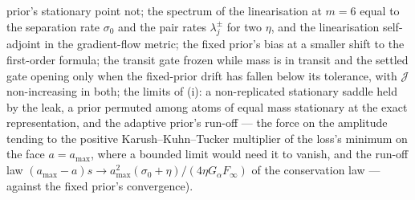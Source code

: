 {prior's stationary point not; the spectrum of the linearisation at $m = 6$ equal to the separation rate $\sigma_0$
and the pair rates $\lambda_j^\pm$ for two $\eta$, and the linearisation self-adjoint in the gradient-flow metric;
the fixed prior's bias at a smaller shift to the first-order formula; the transit gate frozen while mass is in
transit and the settled gate opening only when the fixed-prior drift has fallen below its tolerance, with
$\mathcal{J}$ non-increasing in both; the limits of (i): a non-replicated stationary saddle held by the leak, a prior
permuted among atoms of equal mass stationary at the exact representation, and the adaptive prior's run-off --- the
force on the amplitude tending to the positive Karush--Kuhn--Tucker multiplier of the loss's minimum on the face
$a = a_{\max}$, where a bounded limit would need it to vanish, and the run-off law
$(a_{\max} - a)s\to a_{\max}^2(\sigma_0 + \eta)/(4\eta G_\alpha F_\infty)$ of the conservation law --- against the
fixed prior's convergence).}

